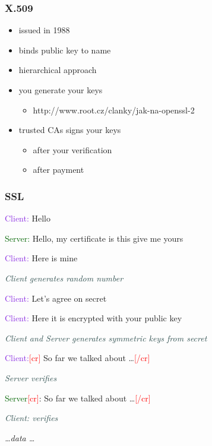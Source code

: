 \begin{frame}[t]
   \frametitle{X.509}
   \begin{itemize}
      \item issued in 1988
      \item binds public key to name
      \item hierarchical approach
      \item you generate your keys
      \begin{itemize}
         \item http://www.root.cz/clanky/jak-na-openssl-2
      \end{itemize}
      \item trusted CAs signs your keys
      \begin{itemize}
         \item after your verification
         \item after payment
      \end{itemize}
   \end{itemize}
\end{frame}

\begin{frame}[t]
   \frametitle{SSL}
   \textcolor{BlueViolet}{Client:} Hello

   \textcolor{DarkGreen}{Server:} Hello, my certificate is this give me yours

   \textcolor{BlueViolet}{Client:} Here is mine

   \textcolor{DarkSlateGray}{\textit{Client generates random number}}

   \textcolor{BlueViolet}{Client:} Let's agree on secret

   \textcolor{BlueViolet}{Client:} Here it is encrypted with your public key

   \textcolor{DarkSlateGrey}{\textit{Client and Server generates symmetric keys from secret}}

   \textcolor{BlueViolet}{Client:}\textcolor{red}{[cr]} So far we talked about \dots \textcolor{red}{[/cr]}

   \textcolor{DarkSlateGrey}{\textit{Server verifies}}
   
   \textcolor{DarkGreen}{Server}\textcolor{red}{[cr]}: So far we talked about \dots \textcolor{red}{[/cr]}
   
   \textcolor{DarkSlateGrey}{\textit{Client: verifies}}

   \textit{\dots data \dots}
\end{frame}
